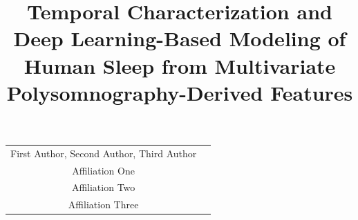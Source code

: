 \documentclass[10pt]{cai26}
\begin{document}
\def\conferenceyear{2026}
\begin{center}

\title{Temporal Characterization and Deep Learning-Based Modeling of Human Sleep from Multivariate Polysomnography-Derived Features}
\maketitle

\thispagestyle{empty}

\begin{tabular}{cc}
First Author\upstairs{\affilone,*}, Second Author\upstairs{\affilone}, Third Author\upstairs{\affilthree}
\\[0.25ex]
{\small \upstairs{\affilone} Affiliation One} \\
{\small \upstairs{\affiltwo} Affiliation Two} \\
{\small \upstairs{\affilthree} Affiliation Three} \\
\end{tabular}
  
\vspace*{0.1in}
\end{center}
\end{document}
